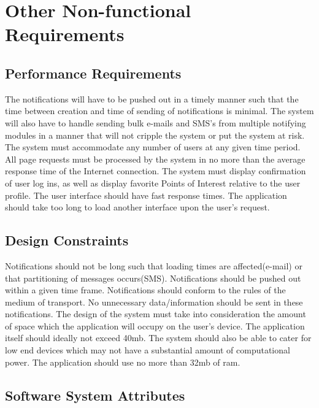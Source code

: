 \documentclass{article}
\begin{document}
    
    \clearpage
\newpage

\section{Other Non-functional Requirements}
\subsection{Performance Requirements}
The notifications will have to be pushed out in a timely manner such that the time between creation and time of sending of notifications is minimal.
\newline
The system will also have to handle sending bulk e-mails and SMS's from multiple notifying modules in a manner that will not cripple the system or put the system at risk.
\newline
The system must accommodate any number of users at any given time period. All page requests must be processed by the system in no more than the average response time of the Internet connection. 
\newline
The system must display confirmation of user log ins, as well as display favorite Points of Interest relative to the user profile.
\newline
The user interface should have fast response times. The application should take too long to load another interface upon the user's request.
\subsection{Design Constraints}

\begin{flushleft}
    Notifications should not be long such that loading times are affected(e-mail) or that partitioning of messages occurs(SMS). Notifications should be pushed out within a given time frame. Notifications should conform to the rules of the medium of transport. No unnecessary data/information should be sent in these notifications. 
\newline
    The design of the system must take into consideration the amount of space which the application will occupy on the user's device. The application itself should ideally not exceed 40mb. The system should also be able to cater for low end devices which may not have a substantial amount of computational power. The application should use no more than 32mb of ram.
    \end{flushleft}

\subsection{Software System Attributes}
\end{document}
